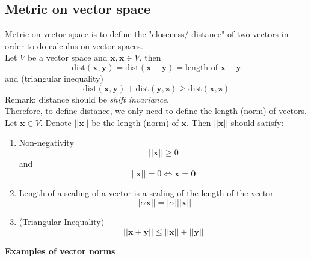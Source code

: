 \documentclass[11pt]{article}
\newcommand{\vx}{\mathbf{x}}
\newcommand{\vy}{\mathbf{y}}
\newcommand{\vz}{\mathbf{z}}
\newcommand{\vzero}{\mathbf{0}}
\begin{document}
\subsection{Metric on vector space}
Metric on vector space is to define the "closeness/ distance" of two vectors in order to do calculus on vector spaces.\\
Let $V$ be a vector space and $\vx, \vx \in V$, then $$\text{dist}(\vx, \vy) = \text{dist}(\vx -\vy) = \text{length of }\vx - \vy$$ and (triangular inequality) $$\text{dist} (\vx, \vy) + \text{dist}(\vy, \vz) \geq \text{dist} (\vx, \vz)$$
Remark: distance should be \textit{shift invariance}.\\
Therefore, to define distance, we only need to define the length (norm) of vectors.\\ Let $\vx \in V$. Denote $||\vx||$ be the length (norm) of $\vx$. Then $||\vx||$ should satisfy:
\begin{enumerate}
\item Non-negativity $$||\vx|| \geq 0$$ and $$||\vx|| = 0 \iff \vx = \vzero$$
\item Length of a scaling of a vector is a scaling of the length of the vector $$||\alpha \vx|| = |\alpha| ||\vx||$$ \begin{center}
\end{center}
\item (Triangular Inequality) $$||\vx + \vy|| \leq ||\vx|| + ||\vy||$$
\begin{center}
\end{center}
\end{enumerate}
\textbf{Examples of vector norms}
\end{document}
